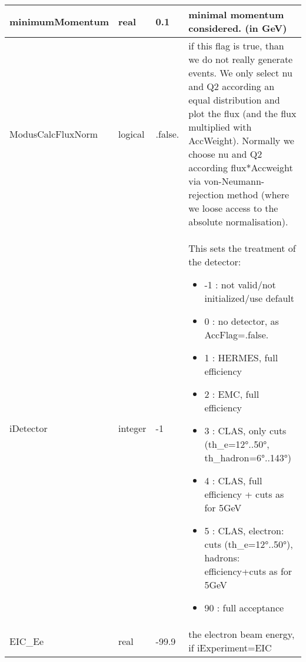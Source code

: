 \documentclass{article}
\begin{document}
\begin{longtable}{llll}
\midrule
minimumMomentum & \begin{minipage}[t]{2cm}real\end{minipage} & \begin{minipage}[t]{2cm}0.1\end{minipage} & \begin{minipage}[t]{12cm}minimal momentum considered. (in GeV)\end{minipage}\\*
\midrule
ModusCalcFluxNorm & \begin{minipage}[t]{2cm}logical\end{minipage} & \begin{minipage}[t]{2cm}.false.\end{minipage} & \begin{minipage}[t]{12cm}if this flag is true, than we do not really generate events. We only select nu and Q2 according an equal distribution and plot the flux (and the flux multiplied with AccWeight). Normally we choose nu and Q2 according flux*Accweight via von-Neumann- rejection method (where we loose access to the absolute normalisation).\end{minipage}\\*
\midrule
iDetector & \begin{minipage}[t]{2cm}integer\end{minipage} & \begin{minipage}[t]{2cm}-1\end{minipage} & \begin{minipage}[t]{12cm}This sets the treatment of the detector:\begin{itemize}\leftmargin0em\itemindent0pt\item -1 : not valid/not initialized/use default\item  0 : no detector, as AccFlag=.false.\item  1 : HERMES, full efficiency\item  2 : EMC, full efficiency\item  3 : CLAS, only cuts (th\_e=12°..50°, th\_hadron=6°..143°)\item  4 : CLAS, full efficiency + cuts as for 5GeV\item  5 : CLAS, electron: cuts (th\_e=12°..50°),              hadrons: efficiency+cuts as for 5GeV\item 90 : full acceptance\end{itemize}\end{minipage}\\*
\midrule
EIC\_Ee & \begin{minipage}[t]{2cm}real\end{minipage} & \begin{minipage}[t]{2cm}-99.9\end{minipage} & \begin{minipage}[t]{12cm}the electron beam energy, if iExperiment=EIC\end{minipage}\\*

\end{longtable}
\end{document}

